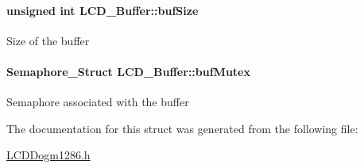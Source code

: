\paragraph[{buf\-Size}]{\setlength{\rightskip}{0pt plus 5cm}unsigned int L\-C\-D\-\_\-\-Buffer\-::buf\-Size}\label{struct_l_c_d___buffer_a77c4adb59142a732371a552558161ebf}
Size of the buffer 
\paragraph[{buf\-Mutex}]{\setlength{\rightskip}{0pt plus 5cm}Semaphore\-\_\-\-Struct L\-C\-D\-\_\-\-Buffer\-::buf\-Mutex}\label{struct_l_c_d___buffer_a48816704d8fb2c059d0c4c2ce3234cd7}
Semaphore associated with the buffer 

The documentation for this struct was generated from the following file\-:\begin{DoxyCompactItemize}
\item 
\hyperlink{_l_c_d_dogm1286_8h}{L\-C\-D\-Dogm1286.\-h}\end{DoxyCompactItemize}
